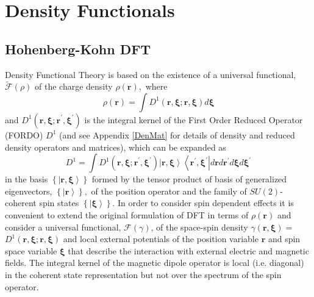 \documentclass[aps,preprint]{revtex4}%
\begin{document}
\section{Density Functionals \label{Standard}}

\subsection{Hohenberg-Kohn DFT}

\bigskip Density Functional Theory is based on the existence of a universal
functional, $\mathcal{\tilde{F}}\left(  \rho\right)  $ \cite{HK} of the charge
density $\rho\left(  \mathbf{r}\right)  ,$ where
\begin{equation}
\rho\left(  \mathbf{r}\right)  =\int D^{1}\left(  \mathbf{r,\xi;r,\xi}\right)
d\mathbf{\xi}%
\end{equation}
and $D^{1}\left(  \mathbf{r,\xi;r}^{\prime}\mathbf{,\xi}^{\prime}\right)  $ is
the integral kernel of the First Order Reduced Operator (FORDO) $D^{1}$
\cite{Coleman} (and see Appendix \ref{DenMat} for details of density and
reduced density operators and matrices), which can be expanded as
\begin{equation}
D^{1}=\int D^{1}\left(  \mathbf{r,\xi;r}^{\prime}\mathbf{,\xi}^{\prime
}\right)  \left\vert \mathbf{r,\xi}\right\rangle \left\langle \mathbf{r}%
^{\prime}\mathbf{,\xi}^{\prime}\right\vert d\mathbf{r}d\mathbf{r}^{\prime
}d\mathbf{\xi}d\mathbf{\xi}^{\prime}%
\end{equation}
in the basis $\left\{  \left\vert \mathbf{r,\xi}\right\rangle \right\}  $
formed by the tensor product of basis of generalized eigenvectors, $\left\{
\left\vert \mathbf{r}\right\rangle \right\}  ,$ of the position operator and
the family of $SU(2)$-coherent spin states $\left\{  \left\vert \mathbf{\xi
}\right\rangle \right\}  $. In order to consider spin dependent effects it is
convenient to extend the original formulation of DFT in terms of $\rho\left(
\mathbf{r}\right)  $ and consider a universal functional, $\mathcal{F}\left(
\gamma\right)  $, of the space-spin density $\gamma\left(  \mathbf{r,\xi
}\right)  =$ $D^{1}\left(  \mathbf{r,\xi;r,\xi}\right)  $
\cite{weiner-trickey} and local external potentials of the position variable
$\mathbf{r}$ and spin space variable $\mathbf{\xi}$ that describe the
interaction with external electric and magnetic fields. The integral kernel of
the magnetic dipole operator is local (i.e. diagonal) in the coherent state
representation but not over the spectrum of the spin operator$.$
\end{document}
